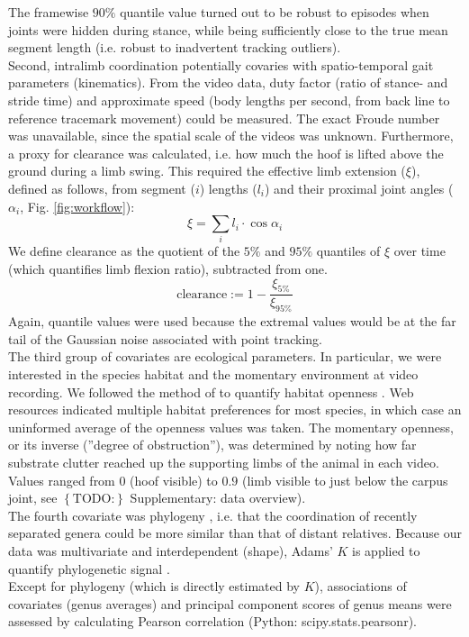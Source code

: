\documentclass[10pt, a4paper]{article}
\newcommand{\todo}[1]{\colorbox{terracotta!30!yellow}{\footnotesize{$\left\lbrace\text{TODO:}\right\rbrace$ }#1\normalsize}}
\begin{document}
The framewise $90\%$ quantile value turned out to be robust to episodes when joints were hidden during stance, while being sufficiently close to the true mean segment length (i.e. robust to inadvertent tracking outliers). 
\\Second, intralimb coordination potentially covaries with spatio-temporal gait parameters (kinematics). 
From the video data, duty factor (ratio of stance- and stride time) and approximate speed (body lengths per second, from back line to reference tracemark movement) could be measured. 
The exact Froude number was unavailable, since the spatial scale of the videos was unknown. 
Furthermore, a proxy for clearance \citep[\textit{cf.}][]{Austin1999} was calculated, i.e. how much the hoof is lifted above the ground during a limb swing. 
This required the effective limb extension ($\xi$), defined as follows, from segment ($i$) lengths ($l_{i}$) and their proximal joint angles ($\alpha_{i}$, Fig. \ref{fig:workflow}):
$$\xi = \sum\limits_{i} l_{i} \cdot \cos{\alpha_{i}}$$
We define clearance as the quotient of the $5\%$ and $95\%$ quantiles of $\xi$ over time (which quantifies limb flexion ratio), subtracted from one. 
$$\text{clearance} := 1 - \frac{\xi_{5\%}}{\xi_{95\%}} $$
Again, quantile values were used because the extremal values would be at the far tail of the Gaussian noise associated with point tracking. 
\\The third group of covariates are ecological parameters. 
In particular, we were interested in the species habitat and the momentary environment at video recording. 
We followed the method of \citet{Stankowich2009} to quantify habitat openness \citep{Caro2004,Stankowich2009}. 
Web resources indicated multiple habitat preferences for most species, in which case an uninformed average of the openness values was taken. 
The momentary openness, or its inverse (''degree of obstruction''), was determined by noting how far substrate clutter reached up the supporting limbs of the animal in each video. 
Values ranged from $0$ (hoof visible) to $0.9$ (limb visible to just below the carpus joint, see \todo{Supplementary: data overview}). 
\\The fourth covariate was phylogeny \citep[Fig. \ref{fig:phylogeny};][]{Zurano2019}, i.e. that the coordination of recently separated genera could be more similar than that of distant relatives. 
Because our data was multivariate and interdependent (shape), Adams' $K$ is applied to quantify phylogenetic signal \citep{Adams2014}. 
\medskip\\Except for phylogeny (which is directly estimated by $K$), associations of covariates (genus averages) and principal component scores of genus means \citep{Mitteroecker2011} were assessed by calculating Pearson correlation (Python: \textsf{scipy.stats.pearsonr}). 
\end{document}
